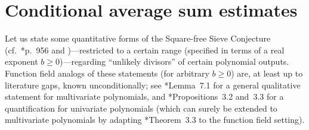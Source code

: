 \documentclass[12pt]{report}
\begin{document}
\section{Conditional average sum estimates}
\label{SEC:SFSC-and-Sarnak-Xue-type-average-sum-bound}

Let us state some quantitative forms of the Square-free Sieve Conjecture (cf.~\cite{miller2004one}*{p.~956} and \cites{granville1998abc,poonen2003squarefree,bhargava2014geometric})---restricted to a certain range (specified in terms of a real exponent $b\geq 0$)---regarding ``unlikely divisors'' of certain polynomial outputs.
Function field analogs of these statements (for arbitrary $b\geq 0$) are, at least up to literature gaps, known unconditionally;
see \cite{poonen2003squarefree}*{Lemma~7.1} for a general qualitative statement for multivariate polynomials,
and \cite{lando2015square}*{Propositions~3.2 and~3.3} for a quantification for univariate polynomials (which can surely be extended to multivariate polynomials by adapting \cite{bhargava2014geometric}*{Theorem~3.3} to the function field setting).




\end{document}

